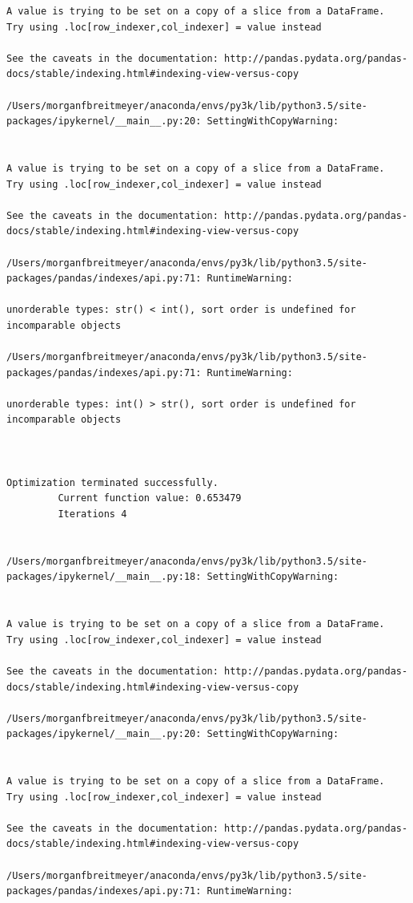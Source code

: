 \begin{lstlisting}
A value is trying to be set on a copy of a slice from a DataFrame.
Try using .loc[row_indexer,col_indexer] = value instead

See the caveats in the documentation: http://pandas.pydata.org/pandas-docs/stable/indexing.html#indexing-view-versus-copy

/Users/morganfbreitmeyer/anaconda/envs/py3k/lib/python3.5/site-packages/ipykernel/__main__.py:20: SettingWithCopyWarning:


A value is trying to be set on a copy of a slice from a DataFrame.
Try using .loc[row_indexer,col_indexer] = value instead

See the caveats in the documentation: http://pandas.pydata.org/pandas-docs/stable/indexing.html#indexing-view-versus-copy

/Users/morganfbreitmeyer/anaconda/envs/py3k/lib/python3.5/site-packages/pandas/indexes/api.py:71: RuntimeWarning:

unorderable types: str() < int(), sort order is undefined for incomparable objects

/Users/morganfbreitmeyer/anaconda/envs/py3k/lib/python3.5/site-packages/pandas/indexes/api.py:71: RuntimeWarning:

unorderable types: int() > str(), sort order is undefined for incomparable objects



Optimization terminated successfully.
         Current function value: 0.653479
         Iterations 4


/Users/morganfbreitmeyer/anaconda/envs/py3k/lib/python3.5/site-packages/ipykernel/__main__.py:18: SettingWithCopyWarning:


A value is trying to be set on a copy of a slice from a DataFrame.
Try using .loc[row_indexer,col_indexer] = value instead

See the caveats in the documentation: http://pandas.pydata.org/pandas-docs/stable/indexing.html#indexing-view-versus-copy

/Users/morganfbreitmeyer/anaconda/envs/py3k/lib/python3.5/site-packages/ipykernel/__main__.py:20: SettingWithCopyWarning:


A value is trying to be set on a copy of a slice from a DataFrame.
Try using .loc[row_indexer,col_indexer] = value instead

See the caveats in the documentation: http://pandas.pydata.org/pandas-docs/stable/indexing.html#indexing-view-versus-copy

/Users/morganfbreitmeyer/anaconda/envs/py3k/lib/python3.5/site-packages/pandas/indexes/api.py:71: RuntimeWarning:


\end{lstlisting}
